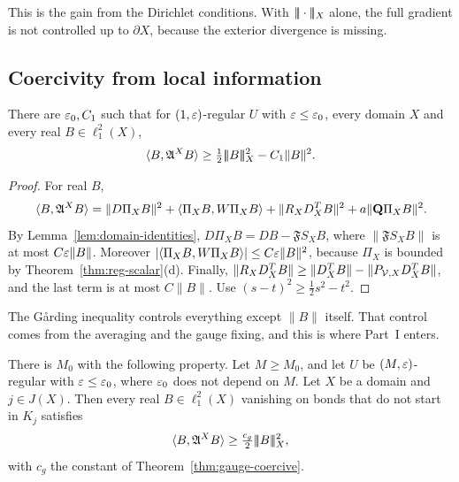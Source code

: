 This is the gain from the Dirichlet conditions. With $|\!|\!|\cdot|\!|\!|_X$ alone, the full gradient is not controlled up to $\partial X$, because the exterior divergence is missing.

\subsection{Coercivity from local information}

\begin{lemma}\label{lem:garding}
There are $\varepsilon_0,C_1$ such that for $(1,\varepsilon)$-regular $U$ with $\varepsilon\le\varepsilon_0$, every domain $X$ and every real $B\in\ell^2_1(X)$,
\[
\langle B,\mathfrak A^XB\rangle\ge\tfrac12|\!|\!|B|\!|\!|_X^2-C_1\|B\|^2 .
\]
\end{lemma}

\begin{proof}
For real $B$,
\[
\langle B,\mathfrak A^XB\rangle=\|D\Pi_XB\|^2+\langle \Pi_XB,W\Pi_XB\rangle+\|R_XD^T_XB\|^2+a\|\mathbf Q\Pi_XB\|^2 .
\]
By Lemma~\ref{lem:domain-identities}, $D\Pi_XB=DB-\mathfrak FS_XB$, where $\|\mathfrak FS_XB\|$ is at most $C\varepsilon\|B\|$. Moreover $|\langle \Pi_XB,W\Pi_XB\rangle|\le C\varepsilon\|B\|^2$, because $\Pi_X$ is bounded by Theorem~\ref{thm:reg-scalar}(d). Finally, $\|R_XD^T_XB\|\ge\|D^T_XB\|-\|P_{\mathcal V,X}D^T_XB\|$, and the last term is at most $C\|B\|$. Use $(s-t)^2\ge\frac12s^2-t^2$.
\end{proof}

The G\aa rding inequality controls everything except $\|B\|$ itself. That control comes from the averaging and the gauge fixing, and this is where Part~I enters.

\begin{lemma}\label{lem:local-coercive}
There is $M_0$ with the following property. Let $M\ge M_0$, and let $U$ be $(M,\varepsilon)$-regular with $\varepsilon\le\varepsilon_0$, where $\varepsilon_0$ does not depend on $M$. Let $X$ be a domain and $j\in J(X)$. Then every real $B\in\ell^2_1(X)$ vanishing on bonds that do not start in $K_j$ satisfies
\[
\langle B,\mathfrak A^XB\rangle\ge\tfrac{c_g}2|\!|\!|B|\!|\!|_X^2 ,
\]
with $c_g$ the constant of Theorem~\ref{thm:gauge-coercive}.
\end{lemma}

